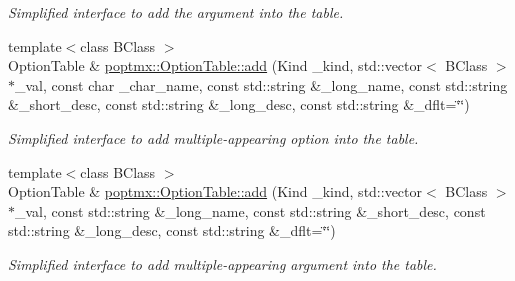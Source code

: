 \begin{DoxyCompactItemize}
\begin{DoxyCompactList}\small\item\em Simplified interface to add the argument into the table. \item\end{DoxyCompactList}\item 
{\footnotesize template$<$class BClass $>$ }\\OptionTable \& \hyperlink{group__poptmx_gabc7aed25667e5d2901455c00348ac4cc}{poptmx::OptionTable::add} (Kind \_\-kind, std::vector$<$ BClass $>$ $\ast$\_\-val, const char \_\-char\_\-name, const std::string \&\_\-long\_\-name, const std::string \&\_\-short\_\-desc, const std::string \&\_\-long\_\-desc, const std::string \&\_\-dflt=\char`\"{}\char`\"{})
\begin{DoxyCompactList}\small\item\em Simplified interface to add multiple-\/appearing option into the table. \item\end{DoxyCompactList}\item 
{\footnotesize template$<$class BClass $>$ }\\OptionTable \& \hyperlink{group__poptmx_ga3d647be8f19d1059ba235a1838fbe1c1}{poptmx::OptionTable::add} (Kind \_\-kind, std::vector$<$ BClass $>$ $\ast$\_\-val, const std::string \&\_\-long\_\-name, const std::string \&\_\-short\_\-desc, const std::string \&\_\-long\_\-desc, const std::string \&\_\-dflt=\char`\"{}\char`\"{})
\begin{DoxyCompactList}\small\item\em Simplified interface to add multiple-\/appearing argument into the table. \item\end{DoxyCompactList}\end{DoxyCompactItemize}

